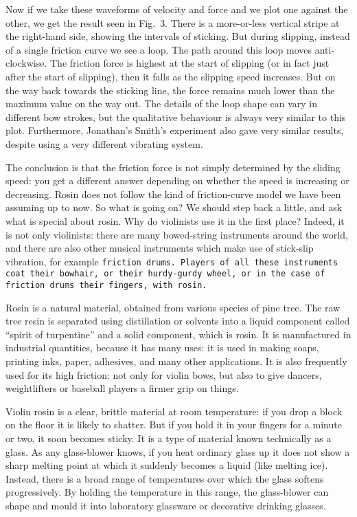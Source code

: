   Now if we take these waveforms of velocity and force and we plot one against 
  the other, we get the result seen in Fig.\ 3. There is a more-or-less 
  vertical stripe at the right-hand side, showing the intervals of sticking. 
  But during slipping, instead of a single friction curve we see a loop. The 
  path around this loop moves anti-clockwise. The friction force is highest at 
  the start of slipping (or in fact just after the start of slipping), then it 
  falls as the slipping speed increases. But on the way back towards the 
  sticking line, the force remains much lower than the maximum value on the way 
  out. The details of the loop shape can vary in different bow strokes, but the 
  qualitative behaviour is always very similar to this plot. Furthermore, 
  Jonathan’s Smith’s experiment also gave very similar results, despite using a 
  very different vibrating system. 

  The conclusion is that the friction force is not simply determined by the 
  sliding speed: you get a different answer depending on whether the speed is 
  increasing or decreasing. Rosin does not follow the kind of friction-curve 
  model we have been assuming up to now. So what is going on? We should step 
  back a little, and ask what is special about rosin. Why do violinists use it 
  in the first place? Indeed, it is not only violinists: there are many 
  bowed-string instruments around the world, and there are also other musical 
  instruments which make use of stick-slip vibration, for example \tt{}friction 
  drums\rm{}. Players of all these instruments coat their bowhair, or their 
  hurdy-gurdy wheel, or in the case of friction drums their fingers, with 
  rosin. 

  Rosin is a natural material, obtained from various species of pine tree. The 
  raw tree resin is separated using distillation or solvents into a liquid 
  component called “spirit of turpentine” and a solid component, which is 
  rosin. It is manufactured in industrial quantities, because it has many uses: 
  it is used in making soaps, printing inks, paper, adhesives, and many other 
  applications. It is also frequently used for its high friction: not only for 
  violin bows, but also to give dancers, weightlifters or baseball players a 
  firmer grip on things. 

  Violin rosin is a clear, brittle material at room temperature: if you drop a 
  block on the floor it is likely to shatter. But if you hold it in your 
  fingers for a minute or two, it soon becomes sticky. It is a type of material 
  known technically as a glass. As any glass-blower knows, if you heat ordinary 
  glass up it does not show a sharp melting point at which it suddenly becomes 
  a liquid (like melting ice). Instead, there is a broad range of temperatures 
  over which the glass softens progressively. By holding the temperature in 
  this range, the glass-blower can shape and mould it into laboratory glassware 
  or decorative drinking glasses. 

